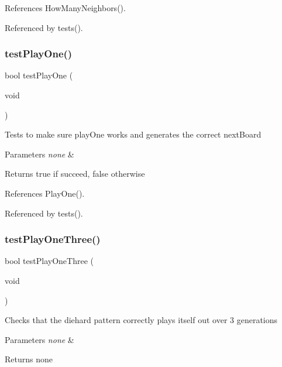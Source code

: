 References How\+Many\+Neighbors().



Referenced by tests().

\mbox{\label{tests_8c_aa4c8095a20d90a18d843ab63ecd02d00}} 
\subsubsection{test\+Play\+One()}
{\footnotesize\ttfamily bool test\+Play\+One (\begin{DoxyParamCaption}\item[{void}]{ }\end{DoxyParamCaption})}

Tests to make sure play\+One works and generates the correct next\+Board 
\begin{DoxyParams}{Parameters}
{\em none} & \\
\hline
\end{DoxyParams}
\begin{DoxyReturn}{Returns}
true if succeed, false otherwise 
\end{DoxyReturn}


References Play\+One().



Referenced by tests().

\mbox{\label{tests_8c_a78144ff4e297fe99f33cc4da375dae89}} 
\subsubsection{test\+Play\+One\+Three()}
{\footnotesize\ttfamily bool test\+Play\+One\+Three (\begin{DoxyParamCaption}\item[{void}]{ }\end{DoxyParamCaption})}

Checks that the diehard pattern correctly plays itself out over 3 generations 
\begin{DoxyParams}{Parameters}
{\em none} & \\
\hline
\end{DoxyParams}
\begin{DoxyReturn}{Returns}
none 
\end{DoxyReturn}


